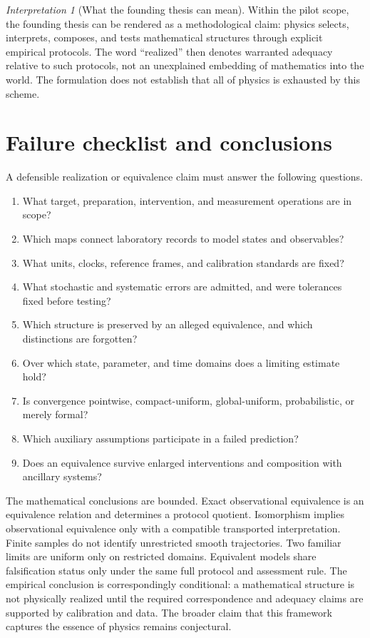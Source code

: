 \documentclass[11pt]{article}
\theoremstyle{remark}
\newtheorem{interpretation}[definition]{Interpretation}
\begin{document}
\begin{interpretation}[What the founding thesis can mean]
Within the pilot scope, the founding thesis can be rendered as a methodological claim: physics selects, interprets, composes, and tests mathematical structures through explicit empirical protocols.  The word ``realized'' then denotes warranted adequacy relative to such protocols, not an unexplained embedding of mathematics into the world.  The formulation does not establish that all of physics is exhausted by this scheme.
\end{interpretation}

\section{Failure checklist and conclusions}

A defensible realization or equivalence claim must answer the following questions.
\begin{enumerate}
 \item What target, preparation, intervention, and measurement operations are in scope?
 \item Which maps connect laboratory records to model states and observables?
 \item What units, clocks, reference frames, and calibration standards are fixed?
 \item What stochastic and systematic errors are admitted, and were tolerances fixed before testing?
 \item Which structure is preserved by an alleged equivalence, and which distinctions are forgotten?
 \item Over which state, parameter, and time domains does a limiting estimate hold?
 \item Is convergence pointwise, compact-uniform, global-uniform, probabilistic, or merely formal?
 \item Which auxiliary assumptions participate in a failed prediction?
 \item Does an equivalence survive enlarged interventions and composition with ancillary systems?
\end{enumerate}

The mathematical conclusions are bounded.  Exact observational equivalence is an equivalence relation and determines a protocol quotient.  Isomorphism implies observational equivalence only with a compatible transported interpretation.  Finite samples do not identify unrestricted smooth trajectories.  Two familiar limits are uniform only on restricted domains.  Equivalent models share falsification status only under the same full protocol and assessment rule.  The empirical conclusion is correspondingly conditional: a mathematical structure is not physically realized until the required correspondence and adequacy claims are supported by calibration and data.  The broader claim that this framework captures the essence of physics remains conjectural.
\end{document}

